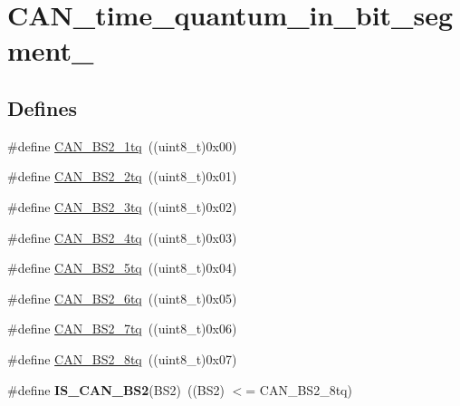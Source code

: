 \hypertarget{group__CAN__time__quantum__in__bit__segment__2}{
\section{CAN\_\-time\_\-quantum\_\-in\_\-bit\_\-segment\_}
\label{group__CAN__time__quantum__in__bit__segment__2}
}
\subsection*{Defines}
\begin{DoxyCompactItemize}
\item 
\#define \hyperlink{group__CAN__time__quantum__in__bit__segment__2_gad9af25a3f61df7b09b8d6a5e81d8027e}{CAN\_\-BS2\_\-1tq}~((uint8\_\-t)0x00)
\item 
\#define \hyperlink{group__CAN__time__quantum__in__bit__segment__2_gac43d82f74990620499f1998187ff3602}{CAN\_\-BS2\_\-2tq}~((uint8\_\-t)0x01)
\item 
\#define \hyperlink{group__CAN__time__quantum__in__bit__segment__2_gab3d325ce4a5d0eb1ee8ee50ad4ec7e49}{CAN\_\-BS2\_\-3tq}~((uint8\_\-t)0x02)
\item 
\#define \hyperlink{group__CAN__time__quantum__in__bit__segment__2_gaaff1c1cdd809f185299971c6437f32a0}{CAN\_\-BS2\_\-4tq}~((uint8\_\-t)0x03)
\item 
\#define \hyperlink{group__CAN__time__quantum__in__bit__segment__2_ga89feba32bcc2e909f858d535edaad101}{CAN\_\-BS2\_\-5tq}~((uint8\_\-t)0x04)
\item 
\#define \hyperlink{group__CAN__time__quantum__in__bit__segment__2_ga72c3245b794d3238763d1ec319bf386f}{CAN\_\-BS2\_\-6tq}~((uint8\_\-t)0x05)
\item 
\#define \hyperlink{group__CAN__time__quantum__in__bit__segment__2_ga8005adaef02fb90e400909de08dec031}{CAN\_\-BS2\_\-7tq}~((uint8\_\-t)0x06)
\item 
\#define \hyperlink{group__CAN__time__quantum__in__bit__segment__2_gaad8dcbb266cf5074bfb67bd7108597c6}{CAN\_\-BS2\_\-8tq}~((uint8\_\-t)0x07)
\item 
\hypertarget{group__CAN__time__quantum__in__bit__segment__2_ga3f5620b1d094dbd7d2fb8d16f4b187a9}{
\#define {\bfseries IS\_\-CAN\_\-BS2}(BS2)~((BS2) $<$= CAN\_\-BS2\_\-8tq)}
\label{group__CAN__time__quantum__in__bit__segment__2_ga3f5620b1d094dbd7d2fb8d16f4b187a9}

\end{DoxyCompactItemize}


